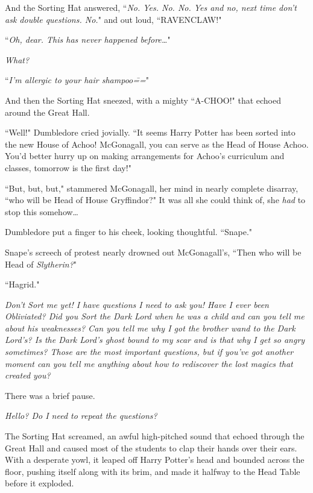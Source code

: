 And the Sorting Hat answered, ``\emph{No. Yes. No. No. Yes and no, next time don't ask double questions. No.}" and out loud, ``RAVENCLAW!"

\later

``\emph{Oh, dear. This has never happened before{\ldots}}"

\emph{What?}

``\emph{I'm allergic to your hair shampoo\===}"

And then the Sorting Hat sneezed, with a mighty ``A-CHOO!" that echoed around the Great Hall.

``Well!" Dumbledore cried jovially. ``It seems Harry Potter has been sorted into the new House of Achoo! McGonagall, you can serve as the Head of House Achoo. You'd better hurry up on making arrangements for Achoo's curriculum and classes, tomorrow is the first day!"

``But, but, but," stammered McGonagall, her mind in nearly complete disarray, ``who will be Head of House Gryffindor?" It was all she could think of, she \emph{had} to stop this somehow{\ldots}

Dumbledore put a finger to his cheek, looking thoughtful. ``Snape."

Snape's screech of protest nearly drowned out McGonagall's, ``Then who will be Head of \emph{Slytherin?}"

``Hagrid."

\later

\emph{Don't Sort me yet! I have questions I need to ask you! Have I ever been Obliviated? Did you Sort the Dark Lord when he was a child and can you tell me about his weaknesses? Can you tell me why I got the brother wand to the Dark Lord's? Is the Dark Lord's ghost bound to my scar and is that why I get so angry sometimes? Those are the most important questions, but if you've got another moment can you tell me anything about how to rediscover the lost magics that created you?}

There was a brief pause.

\emph{Hello? Do I need to repeat the questions?}

The Sorting Hat screamed, an awful high-pitched sound that echoed through the Great Hall and caused most of the students to clap their hands over their ears. With a desperate yowl, it leaped off Harry Potter's head and bounded across the floor, pushing itself along with its brim, and made it halfway to the Head Table before it exploded.

\later

